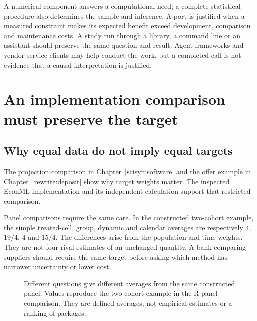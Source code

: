 A numerical component answers a computational need; a complete statistical
procedure also determines the sample and inference. A port is justified when
a measured constraint makes its expected benefit exceed development, comparison
and maintenance costs. A study run
through a library, a command line or an assistant should preserve the same
question and result. Agent frameworks and vendor service clients may help
conduct the work, but a completed call is not evidence that a causal
interpretation is justified.
\citep{exec24_framework_contracts,exec23_workflow_sasctl}



\section{An implementation comparison must preserve the target}
\label{reading:software-conclusions}

\subsection{Why equal data do not imply equal targets}

The projection comparison in Chapter~\ref{scisyn:software} and the offer
example in Chapter~\ref{rewrite:deposit} show why target weights matter.
The inspected EconML implementation and its independent calculation support
that restricted comparison. \citep{exec19_econml_source,exec19_econml_reference}

Panel comparisons require the same care. In the constructed two-cohort example,
the simple treated-cell, group, dynamic and calendar averages are respectively
$4$, $19/4$, $4$ and $15/4$. The differences arise from the population and time
weights. They are not four rival estimates of an unchanged quantity. A bank
comparing suppliers should require the same target before asking which method
has narrower uncertainty or lower cost.~\citep{exec24_panelr_did,exec24_panelr_contract}

\begin{figure}[htbp]\centering
{}
\caption{Different questions give different averages from the same constructed
panel. Values reproduce the two-cohort example in the R panel comparison.
They are defined averages, not empirical estimates or a ranking of packages.
\citep{exec24_panelr_contract}}
\label{reading:panel-averages}
\end{figure}

